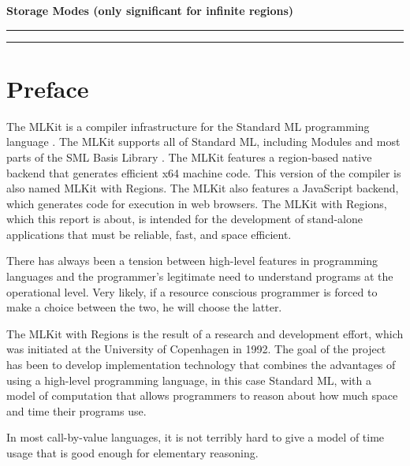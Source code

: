 \documentclass[12pt]{book}
\begin{document}
\begin{center}
\bf Storage Modes (only significant for infinite regions)
\end{center}
\smallskip

\hrule
{}
\hrule
\medskip

\tableofcontents
\chapter*{Preface}
The MLKit is a compiler infrastructure for
%
%
%
the Standard ML programming language \cite{mthm97}. The MLKit supports
all of Standard ML, including Modules and most parts of the SML Basis
Library \cite{basislib2004}.  The MLKit features a region-based native
backend that generates efficient x64 machine code. This version of the
compiler is also named MLKit with Regions. The MLKit also features a
%
%
%
JavaScript backend, which generates code for execution in web
browsers. The MLKit with Regions, which this report is about, is
intended for the development of stand-alone applications that must be
reliable, fast, and space efficient.

There has always been a tension between high-level features in
programming languages and the programmer's legitimate need to
understand programs at the operational level. Very likely, if a
resource conscious programmer is forced to make a choice between the
two, he will choose the latter.

The MLKit with Regions is the result of a research and development
effort, which was initiated at the University of Copenhagen in 1992.
The goal of the project has been to develop implementation technology
that combines the advantages of using a high-level programming
language, in this case Standard ML, with a model of computation that
allows programmers to reason about how much space and time their
programs use.

In most call-by-value languages, it is not terribly hard to give a
model of time usage that is good enough for elementary reasoning.
\end{document}
